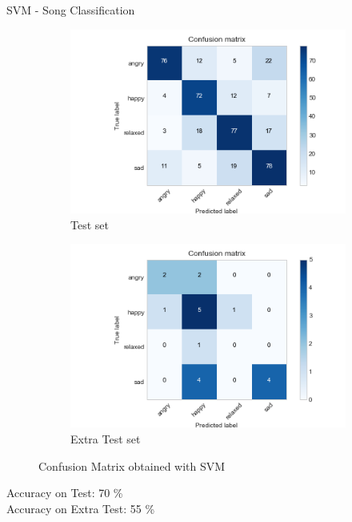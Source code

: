 \documentclass[xcolor=dvipsnames]{beamer}
\begin{document}
\begin{frame}{SVM - Song Classification} 

\begin{figure}[h!]
  \centering
  \begin{subfigure}[b]{0.45\linewidth}
    \includegraphics[width=\linewidth]{./images/CM_SVM.png}
    \caption{Test set}
  \end{subfigure}
  \begin{subfigure}[b]{0.45\linewidth}
    \includegraphics[width=\linewidth]{./images/CM_SVM_extra_test.png}
    \caption{Extra Test set}
  \end{subfigure}
  \caption{Confusion Matrix obtained with SVM}
\end{figure}
Accuracy on Test: 70 \% \\
Accuracy on Extra Test: 55 \%
\end{frame}
\end{document}
